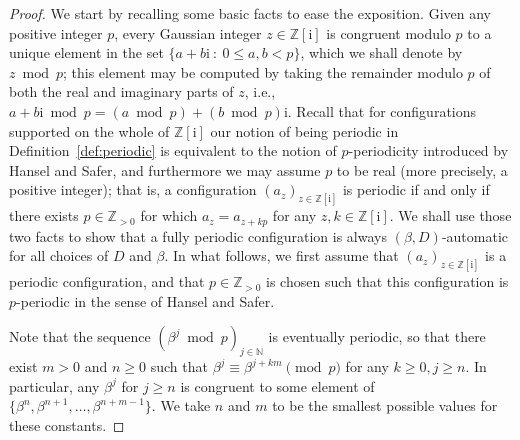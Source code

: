 \documentclass{amsart}
\newcommand{\N}{\mathbb{N}}
\newcommand{\Z}{\mathbb{Z}}
\newcommand{\tcr}{\textcolor{red}}
\newcommand{\ii}{\mathrm{i}}
\newtheorem*{main theorem}{Theorem \ref{thm:main-gaussian}}
\theoremstyle{definition}
\begin{document}
\begin{proof}
We start by recalling some basic facts to ease the exposition. Given any positive integer $p$, every Gaussian integer $z\in\Z[\ii]$ is congruent modulo $p$ to a unique element in the set $\{a+b\ii\::\:0\le a,b<p\}$, which we shall denote by $z\bmod p$; this element may be computed by taking the remainder modulo $p$ of both the real and imaginary parts of $z$, i.e., $a+b\ii\bmod p = (a\bmod p) + (b\bmod p)\ii$. Recall  that for configurations supported on the whole of $\Z[\ii]$ our notion of being periodic in Definition~\ref{def:periodic} is equivalent to the notion of $p$-periodicity introduced by Hansel and Safer, and furthermore we may assume $p$ to be real (more precisely, a positive integer); that is, a configuration $(a_z)_{z\in\Z[\ii]}$ is periodic if and only if there exists $p\in\Z_{>0}$ for which $a_z=a_{z+kp}$ for any $z,k\in\Z[\ii]$. We shall use those two facts to show that a fully periodic configuration is always $(\beta , D)$-automatic for all choices of $D$ and $\beta$. In what follows, we first assume that $(a_z)_{z\in\Z[\ii]}$ is  a periodic configuration, and that $p\in\Z_{>0}$ is chosen such that this configuration is $p$-periodic in the sense of Hansel and Safer.

Note that the sequence $(\beta^j\bmod p)_{j\in\N}$ is eventually periodic,
 so that there exist $m>0$ and $n\geq 0$ such that  $\beta^j\equiv\beta^{j+km}\pmod{p}$ for any $k\ge 0,j\ge n$. In particular, any $\beta^j$ for $j\ge n$ is congruent to some element of $\{\beta^n,\beta^{n+1},\dotsc,\beta^{n+m-1}\}$. We take $n$ and $m$ to be the smallest possible values for these constants.


\end{proof}
\end{document}
